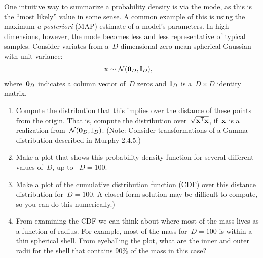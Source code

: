 \begin{problem}
One intuitive way to summarize a probability density is via the mode,
as this is the ``most likely'' value in some sense.  A common example
of this is using the maximum \textit{a posteriori} (MAP) estimate of a
model's parameters.  In high dimensions, however, the mode becomes
less and less representative of typical samples.  Consider variates
from a~$D$-dimensional zero mean spherical Gaussian with unit
variance:
\begin{align*}
  \mathbf{x} &\sim \mathcal{N}(\mathbf{0}_D, \mathbb{I}_D),
\end{align*}
where~$\mathbf{0}_D$ indicates a column vector of~$D$ zeros and~$\mathbb{I}_D$
is a~${D\times D}$ identity matrix.
\begin{enumerate}
  \item Compute the distribution that this implies over the distance
    of these points from the origin.  That is, compute the
    distribution over~$\sqrt{\mathbf{x}^{\mathsf{T}}\mathbf{x}}$, if~$\mathbf{x}$ is a
    realization from~$\mathcal{N}(\mathbf{0}_D, \mathbb{I}_D)$.  (Note: Consider
    transformations of a Gamma distribution described in Murphy 2.4.5.)
  \item Make a plot that shows this probability density function for
    several different values of~$D$, up to ~${D=100}$.

  \item Make a plot of the cumulative distribution function (CDF) over
    this distance distribution for~${D=100}$.  A closed-form solution
    may be difficult to compute, so you can do this numerically.)

  \item From examining the CDF we can think about where most of the
    mass lives as a function of radius.  For example, most of the mass
    for~${D=100}$ is within a thin spherical shell.  From eyeballing
    the plot, what are the inner and outer radii for the shell that
    contains 90\% of the mass in this case?
\end{enumerate}
\end{problem}
